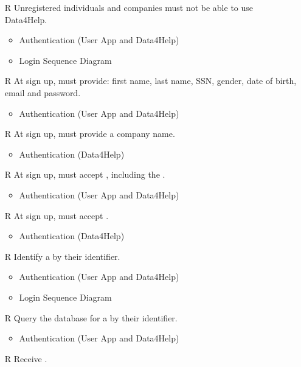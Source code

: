 \begin{itemize}
	\item[R\subs{1}]Unregistered individuals and companies must not be able to use Data4Help.
	\begin{itemize}
		\item Authentication (User App and Data4Help)
		\item Login Sequence Diagram
	\end{itemize}
	\item[R\subs{2}]At sign up,  must provide: first name, last name, SSN, gender, date of birth, email and password.
	\begin{itemize}
		\item Authentication (User App and Data4Help)
	\end{itemize}
	\item[R\subs{3}]At sign up,  must provide a company name.
	\begin{itemize}
		\item Authentication (Data4Help)
	\end{itemize}
	\item[R\subs{4}]At sign up,  must accept , including the .
	\begin{itemize}
		\item Authentication (User App and Data4Help)
	\end{itemize}
	\item[R\subs{5}]At sign up,  must accept .
	\begin{itemize}
		\item Authentication (Data4Help)
	\end{itemize}
	\item[R\subs{6}]Identify a  by their identifier.
	\begin{itemize}
		\item Authentication (User App and Data4Help)
		\item Login Sequence Diagram
	\end{itemize}
	\item[R\subs{7}]Query the database for a  by their identifier.
	\begin{itemize}
		\item Authentication (User App and Data4Help)
	\end{itemize}
	\item[R\subs{8}]Receive .
	\begin{itemize}

\end{itemize}
\end{itemize}
